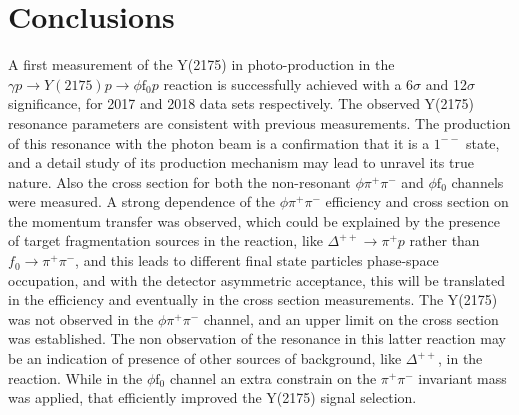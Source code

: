 \section{Conclusions}
\label{p.4.7}

A first measurement of the Y(2175) in photo-production in the $\gamma p \rightarrow Y(2175) p \rightarrow \phi \mathrm{f}_0 p$ reaction is successfully achieved with a 6$\sigma$ and 12$\sigma$ significance, for 2017 and 2018 data sets respectively. The observed Y(2175) resonance parameters are consistent with previous measurements. The production of this resonance with the photon beam is a confirmation that it is a $1^{--}$ state, and a detail study of its production mechanism may lead to unravel its true nature. Also the cross section for both the non-resonant $\phi \pi^+\pi^-$ and $\phi \mathrm{f}_0$ channels were measured. A strong dependence of the $\phi \pi^+\pi^-$ efficiency and cross section on the momentum transfer was observed, which could be explained by the presence of target fragmentation sources in the reaction, like $\Delta^{++} \rightarrow \pi^+ p$ rather than ${f}_0 \rightarrow \pi^+\pi^-$, and this leads to different final state particles phase-space occupation, and with the detector asymmetric acceptance, this will be translated in the efficiency and eventually in the cross section measurements. The Y(2175) was not observed in the $\phi \pi^+\pi^-$ channel, and an upper limit on the cross section was established. The non observation of the resonance in this latter reaction may be an indication of presence of other sources of background, like $\Delta^{++}$, in the reaction. While in the $\phi \mathrm{f}_0$ channel an extra constrain on the $\pi^+\pi^-$ invariant mass was applied, that efficiently improved the Y(2175) signal selection.
